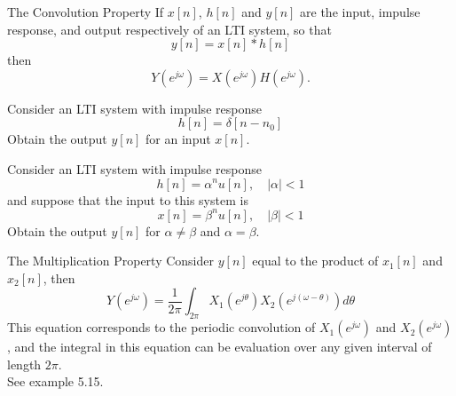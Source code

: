 \begin{frame}{The Convolution Property}
    If $x[n]$, $h[n]$ and $y[n]$ are the input, impulse response, and output respectively of an LTI system, so that
    \begin{equation*}
        y[n] = x[n]\ast h[n]
    \end{equation*}
    then
    \begin{equation*}
        Y(e^{j\omega}) = X(e^{j\omega})H(e^{j\omega}).
    \end{equation*}

    \begin{example}
        Consider an LTI system with impulse response
        \begin{equation*}
          h[n] = \delta[n-n_0]
        \end{equation*}
        Obtain the output $y[n]$ for an input $x[n]$.
    \end{example}
\end{frame}


\begin{frame}
    \begin{example}
        Consider an LTI system with impulse response
        \begin{equation*}
          h[n] = \alpha^n u[n], \quad |\alpha| <1
        \end{equation*}
        and suppose that the input to this system is
        \begin{equation*}
          x[n] = \beta^n u[n], \quad |\beta| <1
        \end{equation*}
        Obtain the output $y[n]$ for $\alpha \neq \beta$ and $\alpha = \beta$.
    \end{example}
\end{frame}


\begin{frame}{The Multiplication Property}
    Consider $y[n]$ equal to the product of $x_1[n]$ and $x_2[n]$, then
    \begin{equation*}
        Y(e^{j\omega}) = \frac{1}{2\pi}\int_{2\pi}X_1(e^{j\theta})X_2(e^{j(\omega - \theta)})d\theta
    \end{equation*}
    This equation corresponds to the \alert{periodic convolution} of $X_1(e^{j\omega})$ and $X_2(e^{j\omega})$, and the integral in this equation can be evaluation over any given interval of length $2\pi$.\\

    See example 5.15.
\end{frame}

